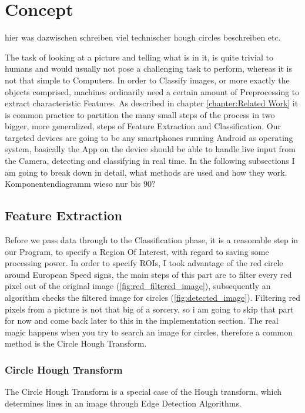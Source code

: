 \chapter{Concept}\label{chapter:Concept}
hier was dazwischen schreiben
viel technischer \newline
hough circles beschreiben etc.\newline\newline

The task of looking at a picture and telling what is in it, is quite trivial to humans and would usually not pose a challenging task to perform, whereas it is not that simple to Computers. In order to Classify images, or more exactly the objects comprised, machines ordinarily need a certain amount of Preprocessing to extract characteristic Features. As described in chapter \ref{chapter:Related Work} it is common practice to partition the many small steps of the process in two bigger, more generalized, steps of Feature Extraction and Classification. Our targeted devices are going to be any smartphones running Android as operating system, basically the App on the device should be able to handle live input from the Camera, detecting and classifying in real time. In the following subsections I am going to break down in detail, what  methods are used and how they work. \newline
Komponentendiagramm\newline
wieso nur bis 90? 

\section{Feature Extraction}
Before we pass data through to the Classification phase, it is a reasonable step in our Program, to specify a Region Of Interest, with regard to saving some processing power. In order to specify ROIs, I took advantage of the red circle around European Speed signs, the main steps of this part are to filter every red pixel out of the original image (\ref{fig:red_filtered_image}), subsequently an algorithm checks the filtered image for circles (\ref{fig:detected_image}). Filtering red pixels from a picture is not that big of a sorcery, so i am going to skip that part for now and come back later to this in the implementation section. The real magic happens when you try to search an image for circles, therefore a common method is the Circle Hough Transform. 
\subsection{Circle Hough Transform}
The Circle Hough Transform is a special case of the Hough transform, which determines lines in an image through Edge Detection Algorithms.


